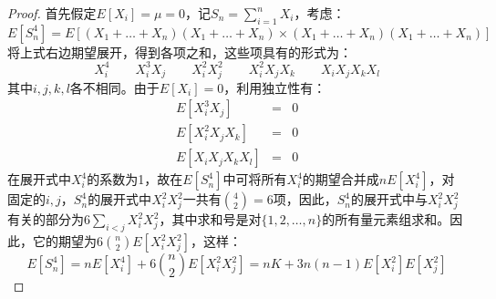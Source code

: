 \documentclass[10pt,a4paper,UTF8]{article}
\begin{document}
\begin{proof}
首先假定\(E[X_{i}] = \mu = 0\)，记\(S_{n} = \sum_{i=1}^{n}X_{i}\)，考虑：
\begin{equation}
\label{eq:4}
E[S_{n}^{4}] = E[(X_{1} + \ldots +X_{n})(X_{1} + \ldots + X_{n})\times (X_{1}+\ldots +X_{n})(X_{1}+ \ldots + X_{n})]
\end{equation}
将上式右边期望展开，得到各项之和，这些项具有的形式为：
\begin{equation}
\label{eq:5}
X_{i}^{4} \qquad X_{i}^{3}X_{j} \qquad X_{i}^{2}X_{j}^{2} \qquad X_{i}^{2}X_{j}X_{k} \qquad X_{i}X_{j}X_{k}X_{l}
\end{equation}
其中\(i,j,k,l\)各不相同。由于\(E[X_{i}] = 0\)，利用独立性有：
\begin{eqnarray}
\label{eq:6}
E[X_{i}^{3}X_{j}] &=& 0\\
E[X_{i}^{2}X_{j}X_{k}] &=& 0 \\
E[X_{i}X_{j}X_{k}X_{l}] &=& 0
\end{eqnarray}
在展开式中\(X_{i}^{4}\)的系数为1，故在\(E[S_{n}^{4}]\)中可将所有\(X_{i}^{4}\)的期望合并成\(nE[X_{i}^{4}]\)，对固定的\(i,j\)，\(S_{n}^{4}\)的展开式中\(X_{i}^{2}X_{j}^{2}\)一共有\(\binom{4}{2}= 6\)项，因此，\(S_{n}^{4}\)的展开式中与\(X_{i}^{2}X_{j}^{2}\)有关的部分为\(6\sum_{i < j}X_{i}^{2}X_{j}^{2}\)，其中求和号是对\(\{1,2,\ldots ,n\}\)的所有量元素组求和。因此，它的期望为\(6\binom{n}{2}E[X_{i}^{2}X_{j}^{2}]\)，这样：
\begin{equation}
\label{eq:7}
E[S_{n}^{4}] = nE[X_{i}^{4}] + 6\binom{n}{2}E[X_{i}^{2}X_{j}^{2}] = nK + 3n(n-1)E[X_{i}^{2}]E[X_{j}^{2}]
\end{equation}


\end{proof}
\end{document}
